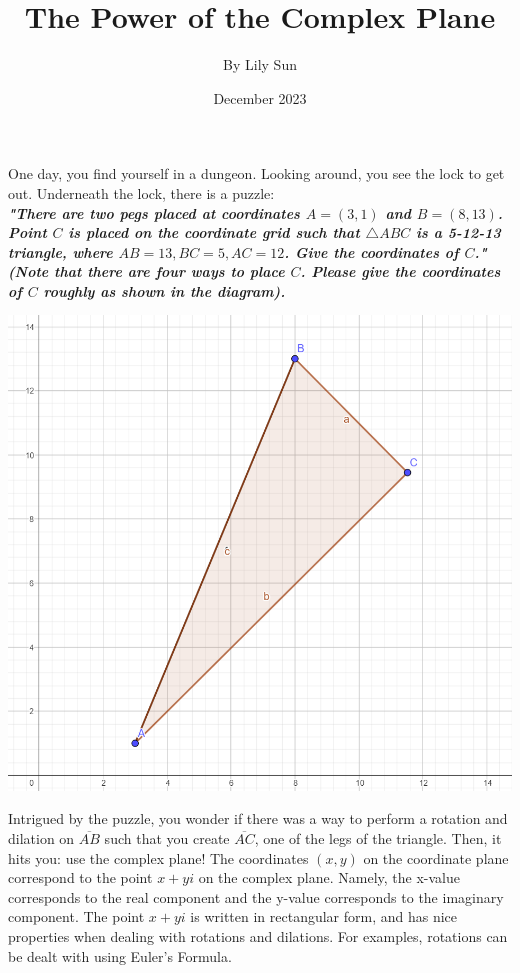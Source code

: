 \documentclass{article}
\title{The Power of the Complex Plane}
\author{By Lily Sun}
\date{December 2023}
\begin{document}
\maketitle
One day, you find yourself in a dungeon. Looking around, you see the lock to get out. Underneath the lock, there is a puzzle: \\

\textit{\textbf{"There are two pegs placed at coordinates $A = (3, 1)$ and $B = (8, 13)$. Point $C$ is placed on the coordinate grid such that $\triangle ABC$ is a 5-12-13 triangle, where $AB = 13, BC = 5, AC = 12$. Give the coordinates of $C$." (Note that there are four ways to place $C$. Please give the coordinates of $C$ roughly as shown in the diagram).}} \\

\begin{center}
\includegraphics[scale = 0.5]{images/A3_1.png} \\
\end{center}

Intrigued by the puzzle, you wonder if there was a way to perform a rotation and dilation on $\overline{AB}$ such that you create $\overline{AC}$, one of the legs of the triangle. Then, it hits you: use the complex plane! The coordinates $(x, y)$ on the coordinate plane correspond to the point $x + yi$ on the complex plane. Namely, the x-value corresponds to the real component and the y-value corresponds to the imaginary component. The point $x+yi$ is written in rectangular form, and has nice properties when dealing with rotations and dilations. For examples, rotations can be dealt with using Euler's Formula.
\end{document}

